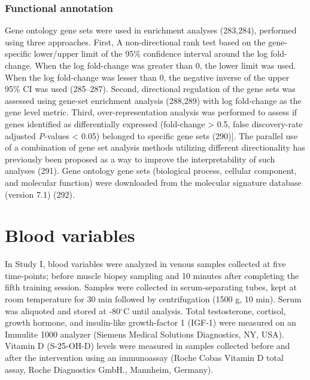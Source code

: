 \documentclass[twoside,10pt]{gihclass} %
\begin{document}
\hypertarget{functional-annotation}{%
\subsubsection{Functional annotation}\label{functional-annotation}}

Gene ontology gene sets were used in enrichment analyses
(283,284),
performed using three approaches.
First, A non-directional rank test based on the gene-specific lower/upper limit of the 95\% confidence interval around the log fold-change. When the log fold-change was greater than 0, the lower limit was used. When the log fold-change was lesser than 0, the negative inverse of the upper 95\% CI was used
(285--287).
Second, directional regulation of the gene sets was assessed using gene-set enrichment analysis
(288,289) with log fold-change as the gene level metric.
Third, over-representation analysis was performed to assess if genes identified as differentially expressed (\textbar fold-change\textbar{} \textgreater{} 0.5, false discovery-rate adjusted \emph{P}-values \textless{} 0.05) belonged to specific gene sets
(290){]}.
The parallel use of a combination of gene set analysis methods utilizing different directionality has previously been proposed as a way to improve the interpretability of such analyses
(291).
Gene ontology gene sets (biological process, cellular component, and molecular function) were downloaded from the molecular signature database (version 7.1) (292).

\hypertarget{blood-variables}{%
\section{Blood variables}\label{blood-variables}}

In Study I, blood variables were analyzed in venous samples collected at five time-points; before muscle biopsy sampling and 10 minutes after completing the fifth training session. Samples were collected in serum-separating tubes, kept at room temperature for 30 min followed by centrifugation (1500 g, 10 min). Serum was aliquoted and stored at -80\(^{\circ}\)C until analysis.
Total testosterone, cortisol, growth hormone, and insulin-like growth-factor 1 (IGF-1) were measured on an Immulite 1000 analyzer (Siemens Medical Solutions Diagnostics, NY, USA). Vitamin D (S-25-OH-D) levels were measured in samples collected before and after the intervention using an immunoassay (Roche Cobas Vitamin D total assay, Roche Diagnostics GmbH., Mannheim, Germany).
\end{document}

